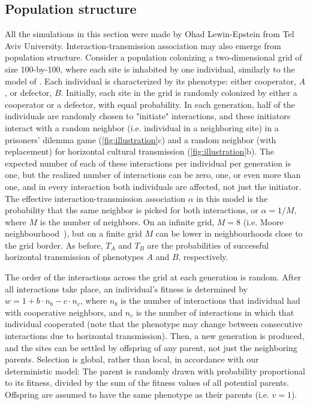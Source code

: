 \documentclass[12pt]{extarticle}
\begin{document}
\subsection{Population structure}
All the simulations in this section were made by Ohad Lewin-Epstein from Tel Aviv University.
Interaction-transmission association may also emerge from population structure.
Consider a  population colonizing a two-dimensional grid of size 100-by-100, where each site is inhabited by one individual, similarly to the model of \citet{lewin2020rockpaperscissors}.
Each individual is characterized by its phenotype: either cooperator, $A$, or defector, $B$.
Initially, each site in the grid is randomly colonized by either a cooperator or a defector, with equal probability.
In each generation, half of the individuals are randomly chosen to "initiate" interactions, and these
initiators interact with a random neighbor (i.e. individual in a neighboring site) in a prisoners' dilemma game (\autoref{fig:illustration}c) and a random neighbor (with replacement) for horizontal cultural transmission (\autoref{fig:illustration}b).
The expected number of each of these interactions per individual per generation is one, but the realized number of interactions can be zero, one, or even more than one, and in every interaction both individuals are affected, not just the initiator.
The effective interaction-transmission association $\alpha$ in this model is the probability that the same neighbor is picked for both interactions, or $\alpha=1/M$, where $M$ is the number of neighbors.
On an infinite grid, $M=8$ (i.e. Moore neighbourhood~\citep{moore1962machine}), but on a finite grid $M$ can be lower in neighbourhoods close to the grid border.
As before, $T_A$ and $T_B$ are the probabilities of successful horizontal transmission of phenotypes $A$ and $B$, respectively.

The order of the interactions across the grid at each generation is random.
After all interactions take place, an individual's fitness is determined by
$w = 1 + b \cdot n_b - c \cdot n_c$,
where $n_b$ is the number of interactions that individual had with cooperative neighbors,
and $n_c$ is the number of interactions in which that individual cooperated (note that the phenotype may change between consecutive interactions due to horizontal transmission).
Then, a new generation is produced, and the sites can be settled by offspring of any parent, not just the neighboring parents.
Selection is global, rather than local, in accordance with our deterministic model:
The parent is randomly drawn with probability proportional to its fitness, divided by the sum of the fitness values of all potential parents.
Offspring are assumed to have the same phenotype as their parents (i.e. $v=1$).
\end{document}
